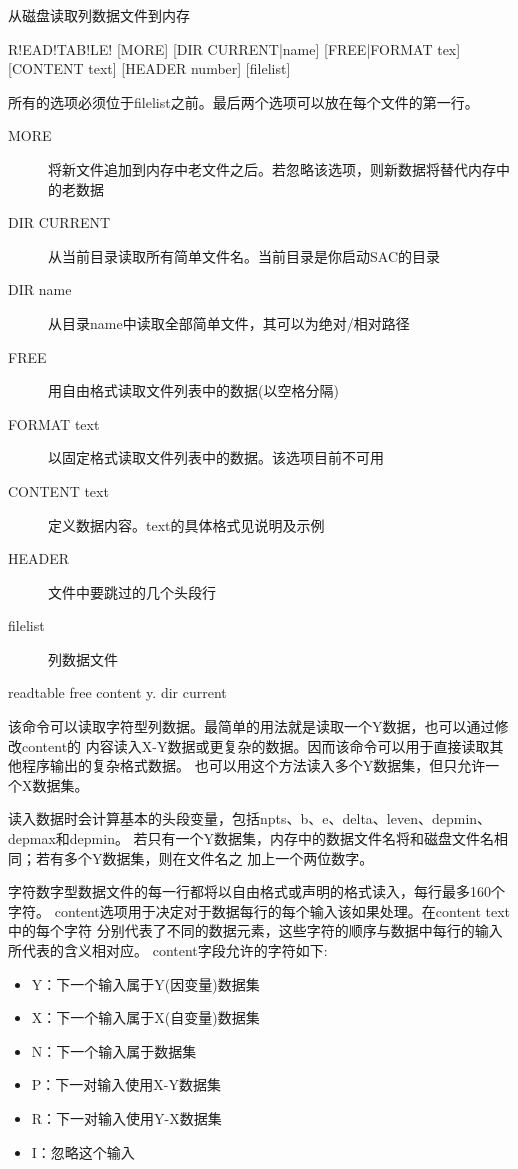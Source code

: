 \label{cmd:readtable}

从磁盘读取列数据文件到内存

\begin{SACSTX}
R!EAD!TAB!LE! [MORE] [DIR CURRENT|name] [FREE|FORMAT tex]
    [CONTENT text] [HEADER number] [filelist]
\end{SACSTX}
所有的选项必须位于filelist之前。最后两个选项可以放在每个文件的第一行。

\begin{description}
\item [MORE] 将新文件追加到内存中老文件之后。若忽略该选项，则新数据将替代内存中的老数据
\item [DIR CURRENT] 从当前目录读取所有简单文件名。当前目录是你启动SAC的目录
\item [DIR name] 从目录name中读取全部简单文件，其可以为绝对/相对路径
\item [FREE] 用自由格式读取文件列表中的数据(以空格分隔)
\item [FORMAT text] 以固定格式读取文件列表中的数据。该选项目前不可用
\item [CONTENT text] 定义数据内容。text的具体格式见说明及示例
\item [HEADER] 文件中要跳过的几个头段行
\item [filelist] 列数据文件
\end{description}

\begin{SACDFT}
readtable free content y. dir current
\end{SACDFT}

该命令可以读取字符型列数据。最简单的用法就是读取一个Y数据，也可以通过修改content的
内容读入X-Y数据或更复杂的数据。因而该命令可以用于直接读取其他程序输出的复杂格式数据。
也可以用这个方法读入多个Y数据集，但只允许一个X数据集。

读入数据时会计算基本的头段变量，包括npts、b、e、delta、leven、depmin、depmax和depmin。
若只有一个Y数据集，内存中的数据文件名将和磁盘文件名相同；若有多个Y数据集，则在文件名之
加上一个两位数字。

字符数字型数据文件的每一行都将以自由格式或声明的格式读入，每行最多160个字符。
content选项用于决定对于数据每行的每个输入该如果处理。在content text中的每个字符
分别代表了不同的数据元素，这些字符的顺序与数据中每行的输入所代表的含义相对应。
content字段允许的字符如下:
\begin{itemize}
\item Y：下一个输入属于Y(因变量)数据集
\item X：下一个输入属于X(自变量)数据集
\item N：下一个输入属于数据集
\item P：下一对输入使用X-Y数据集
\item R：下一对输入使用Y-X数据集
\item I：忽略这个输入
\end{itemize}

